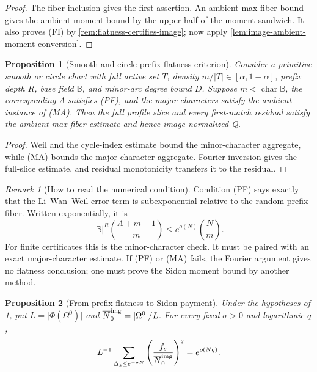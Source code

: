 \documentclass[12pt,a4paper]{amsart}
\numberwithin{equation}{section}
\newtheorem{proposition}[proposition]{Proposition}
\theoremstyle{remark}
\newtheorem{remark}[remark]{Remark}
\newcommand{\B}{\mathbb B}
\newcommand{\barN}{\overline N}
\newcommand{\abs}[1]{\lvert #1\rvert}
\begin{document}
\begin{proof}
The fiber inclusion gives the first assertion.  An ambient max-fiber bound
gives the ambient moment bound by the upper half of the moment sandwich.
It also proves \textup{(FI)} by \cref{rem:flatness-certifies-image}; now
apply \cref{lem:image-ambient-moment-conversion}.
\end{proof}

\begin{proposition}[Smooth and circle prefix-flatness criterion]\label{prop:smooth-circle-prefix-flatness-criterion}
Consider a primitive smooth or circle chart with full active set \(T\),
density \(m/\abs T\in[\alpha,1-\alpha]\), prefix depth \(R\), base field
\(\B\), and minor-arc degree bound \(D\).  Suppose
\(m<\operatorname{char}\B\), the corresponding \(\Lambda\) satisfies
\textup{(PF)}, and the major characters satisfy the ambient instance of
\textup{(MA)}.  Then the
full profile slice and every first-match residual satisfy the ambient
max-fiber estimate and hence image-normalized Q.
\end{proposition}

\begin{proof}
Weil and the cycle-index estimate bound the minor-character aggregate,
while \textup{(MA)} bounds the major-character aggregate.  Fourier
inversion gives the full-slice estimate, and residual monotonicity transfers
it to the residual.
\end{proof}

\begin{remark}[How to read the numerical condition]\label{rem:pf-numerical}
Condition \textup{(PF)} says exactly that the Li--Wan--Weil error term is subexponential relative to the random prefix fiber.  Written exponentially, it is
\[
        \abs\B^R\binom{\Lambda+m-1}{m}\le e^{o(N)}\binom Nm.
\]
For finite certificates this is the minor-character check.  It must be
paired with an exact major-character estimate.  If \textup{(PF)} or
\textup{(MA)} fails, the Fourier argument gives no flatness conclusion;
one must prove the Sidon moment bound by another method.
\end{remark}

\begin{proposition}[From prefix flatness to Sidon payment]\label{prop:equidistribution-to-sidon}
Under the hypotheses of
\cref{prop:smooth-circle-prefix-flatness-criterion}, put
\(L=\abs{\Phi(\Omega^0)}\) and
\(\barN_0^{\rm img}=\abs{\Omega^0}/L\).  For every fixed \(\sigma>0\)
and logarithmic \(q\),
\[
        L^{-1}\sum_{\Delta_s\le e^{-\sigma N}}
        \left(\frac{f_s}{\barN_0^{\rm img}}\right)^q=e^{o(Nq)}.
\]
\end{proposition}
\end{document}
